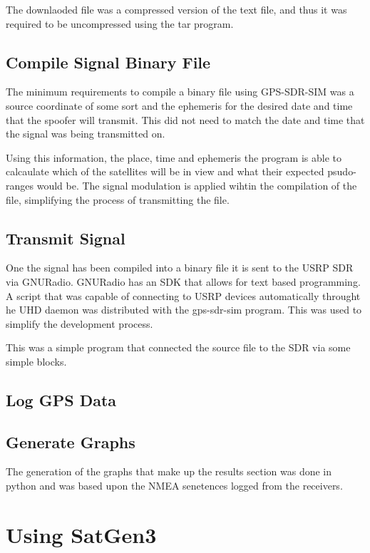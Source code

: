 The downlaoded file was a compressed version of the text file, and thus it was required to be uncompressed using the tar program.

\subsection{Compile Signal Binary File}
The minimum requirements to compile a binary file using GPS-SDR-SIM was a source coordinate of some sort and the ephemeris for the desired date and time that the spoofer
will transmit. This did not need to match the date and time that the signal was being transmitted on.

Using this information, the place, time and ephemeris the program is able to calcaulate which of the satellites will be in view and what their expected psudo-ranges would
be. The signal modulation is applied wihtin the compilation of the file, simplifying the process of transmitting the file. 

\subsection{Transmit Signal}
One the signal has been compiled into a binary file it is sent to the USRP SDR via GNURadio. GNURadio has an SDK that allows for text based programming. A script that was
capable of connecting to USRP devices automatically throught he UHD daemon was distributed with the gps-sdr-sim program. This was used to simplify the development
process. 

This was a simple program that connected the source file to the SDR via some simple blocks.


\subsection{Log GPS Data}

\subsection{Generate Graphs}
The generation of the graphs that make up the results section was done in python and was based upon the NMEA senetences logged from the receivers. 

\section{Using SatGen3}

